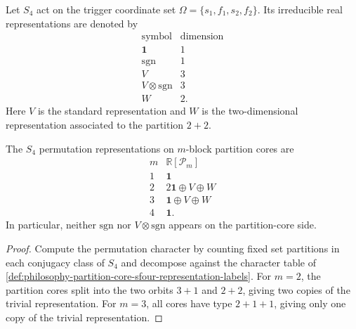 \begin{definition}
\label{def:philosophy-partition-core-sfour-representation-labels}
Let $S_{4}$ act on the trigger coordinate set
$\Omega=\{s_{1},f_{1},s_{2},f_{2}\}$. Its irreducible real
representations are denoted by
$$
\begin{array}{c|c}
  \text{symbol} & \text{dimension}\\
  \hline
  \mathbf{1} & 1\\
  \mathrm{sgn} & 1\\
  V & 3\\
  V\otimes\mathrm{sgn} & 3\\
  W & 2.
\end{array}
$$
Here $V$ is the standard representation and $W$ is the
two-dimensional representation associated to the partition $2+2$.
\end{definition}

\begin{theorem}
\label{thm:philosophy-partition-core-permutation-modules}
The $S_{4}$ permutation representations on $m$-block partition cores are
$$
\begin{array}{c|c}
  m & \mathbb{R}[\mathcal{P}_{m}]\\
  \hline
  1 & \mathbf{1}\\
  2 & 2\mathbf{1}\oplus V\oplus W\\
  3 & \mathbf{1}\oplus V\oplus W\\
  4 & \mathbf{1}.
\end{array}
$$
In particular, neither $\mathrm{sgn}$ nor $V\otimes\mathrm{sgn}$ appears
on the partition-core side.
\end{theorem}
\begin{proof}
Compute the permutation character by counting fixed set partitions in
each conjugacy class of $S_{4}$ and decompose against the character table
of \autoref{def:philosophy-partition-core-sfour-representation-labels}.
For $m=2$, the partition cores split into the two orbits $3+1$ and
$2+2$, giving two copies of the trivial representation. For $m=3$, all
cores have type $2+1+1$, giving only one copy of the trivial
representation.
\end{proof}

